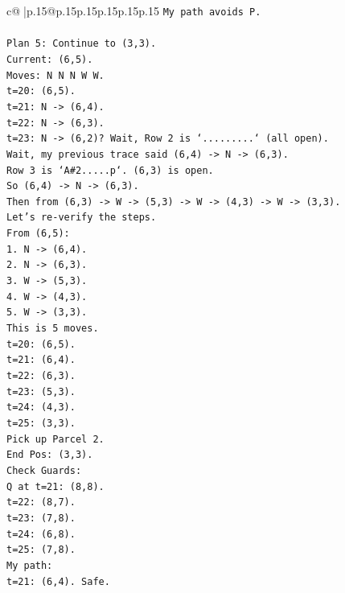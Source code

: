 \documentclass{article}
\begin{document}
{\begin{supertabular}{c@{$\;$}|p{.15\linewidth}@{}p{.15\linewidth}p{.15\linewidth}p{.15\linewidth}p{.15\linewidth}p{.15\linewidth}}
{{{\texttt{My path avoids P.} \\
\\ 
\texttt{Plan 5: Continue to (3,3).} \\
\texttt{Current: (6,5).} \\
\texttt{Moves: N N N W W.} \\
\texttt{t=20: (6,5).} \\
\texttt{t=21: N {-}> (6,4).} \\
\texttt{t=22: N {-}> (6,3).} \\
\texttt{t=23: N {-}> (6,2)? Wait, Row 2 is `.........` (all open).} \\
\texttt{Wait, my previous trace said (6,4) {-}> N {-}> (6,3).} \\
\texttt{Row 3 is `A\#2.....p`. (6,3) is open.} \\
\texttt{So (6,4) {-}> N {-}> (6,3).} \\
\texttt{Then from (6,3) {-}> W {-}> (5,3) {-}> W {-}> (4,3) {-}> W {-}> (3,3).} \\
\texttt{Let's re{-}verify the steps.} \\
\texttt{From (6,5):} \\
\texttt{1. N {-}> (6,4).} \\
\texttt{2. N {-}> (6,3).} \\
\texttt{3. W {-}> (5,3).} \\
\texttt{4. W {-}> (4,3).} \\
\texttt{5. W {-}> (3,3).} \\
\texttt{This is 5 moves.} \\
\texttt{t=20: (6,5).} \\
\texttt{t=21: (6,4).} \\
\texttt{t=22: (6,3).} \\
\texttt{t=23: (5,3).} \\
\texttt{t=24: (4,3).} \\
\texttt{t=25: (3,3).} \\
\texttt{Pick up Parcel 2.} \\
\texttt{End Pos: (3,3).} \\
\texttt{Check Guards:} \\
\texttt{Q at t=21: (8,8).} \\
\texttt{t=22: (8,7).} \\
\texttt{t=23: (7,8).} \\
\texttt{t=24: (6,8).} \\
\texttt{t=25: (7,8).} \\
\texttt{My path:} \\
\texttt{t=21: (6,4). Safe.} \\
}}}
\end{supertabular}}
\end{document}
